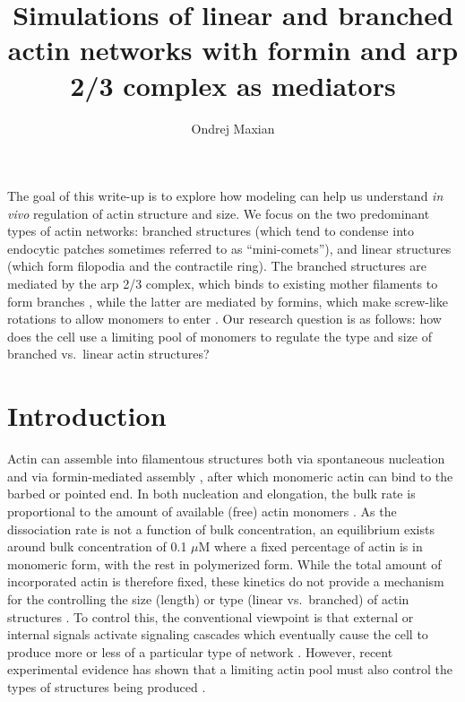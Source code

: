 \documentclass[11pt]{article}
\title{Simulations of linear and branched actin networks with formin and arp 2/3 complex as mediators  \vspace{-0.5 cm}}
\author{Ondrej Maxian  \vspace{-0.75 cm}}
\begin{document}
\maketitle

The goal of this write-up is to explore how modeling can help us understand \emph{in vivo} regulation of actin structure and size. We focus on the two predominant types of actin networks: branched structures (which tend to condense into endocytic patches sometimes referred to as ``mini-comets''), and linear structures (which form filopodia and the contractile ring). The branched structures are mediated by the arp 2/3 complex, which binds to existing mother filaments to form branches \cite{pollard2007regulation}, while the latter are mediated by formins, which make screw-like rotations to allow monomers to enter \cite{shemesh2005novel, li2022torque}. Our research question is as follows: how does the cell use a limiting pool of monomers to regulate the type and size of branched vs.\ linear actin structures?

\section{Introduction} 
Actin can assemble into filamentous structures both via spontaneous nucleation and via formin-mediated assembly \cite{rosenbloom2021mechanism, pollard2007regulation}, after which monomeric actin can bind to the barbed or pointed end. In both nucleation and elongation, the bulk rate is proportional to the amount of available (free) actin monomers \cite{suarez2016internetwork}. As the dissociation rate is not a function of bulk concentration, an equilibrium exists around bulk concentration of 0.1 $\mu$M where a fixed percentage of actin is in monomeric form, with the rest in polymerized form. While the total amount of incorporated actin is therefore fixed, these kinetics do not provide a mechanism for the controlling the size (length) or type (linear vs.\ branched) of actin structures \cite{mohapatra2017limiting}. To control this, the conventional viewpoint is that external or internal signals activate signaling cascades which eventually cause the cell to produce more or less of a particular type of network \cite{martin2005tea4p, pollard2007regulation, suarez2016internetwork}. However, recent experimental evidence has shown that a limiting actin pool must also control the types of structures being produced \cite{burke2014homeostatic}. 
\end{document}
